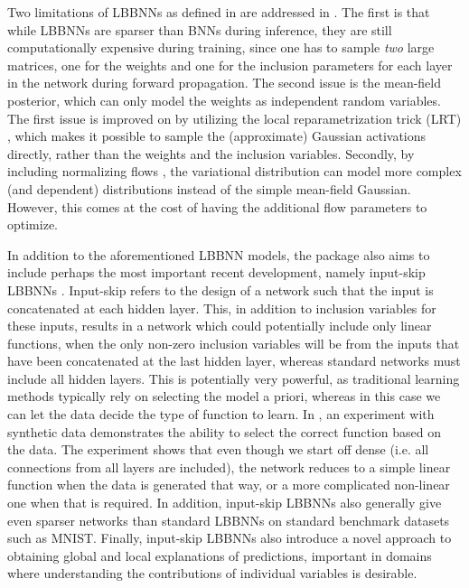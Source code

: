 Two limitations of LBBNNs as defined in \cite{hubin2024sparse} are addressed in \cite{skaaret-lund2024sparsifying}. The first is that while LBBNNs are sparser than BNNs during inference, they are still computationally expensive during training, since one has to sample \emph{two} large matrices, one for the weights and one for the inclusion parameters for each layer in the network during forward propagation. The second issue is the mean-field posterior, which can only model the weights as independent random variables. The first issue is improved on by utilizing the local reparametrization trick (LRT) \citep{kingma2015variational}, which makes it possible to sample the (approximate) Gaussian activations directly, rather than the weights and the inclusion variables. Secondly, by including normalizing flows \citep{rezende2015variational}, the variational distribution can model more complex (and dependent) distributions instead of the simple mean-field Gaussian. However, this comes at the cost of having the additional flow parameters to optimize. 

In addition to the aforementioned LBBNN models, the package also aims to include perhaps the most important recent development, namely input-skip LBBNNs \citep{hoyheim2026explainable}. Input-skip refers to the design of a network such that the input is concatenated at each hidden layer. This, in addition to inclusion variables for these inputs, results in a network which could potentially include only linear functions, when the only non-zero inclusion variables will be from the inputs that have been concatenated at the last hidden layer, whereas standard networks must include all hidden layers. This is potentially very powerful, as traditional learning methods typically rely on selecting the model a priori, whereas in this case we can let the data decide the type of function to learn. In \cite{hoyheim2026explainable}, an experiment with synthetic data demonstrates the ability to select the correct function based on the data. The experiment shows that even though we start off dense (i.e. all connections from all layers are included), the network reduces to a simple linear function when the data is generated that way, or a more complicated non-linear one when that is required. In addition, input-skip LBBNNs also generally give even sparser networks than standard LBBNNs on standard benchmark datasets such as MNIST. Finally, input-skip LBBNNs also introduce a novel approach to obtaining global and local explanations of predictions, important in domains where understanding the contributions of individual variables is desirable. 

